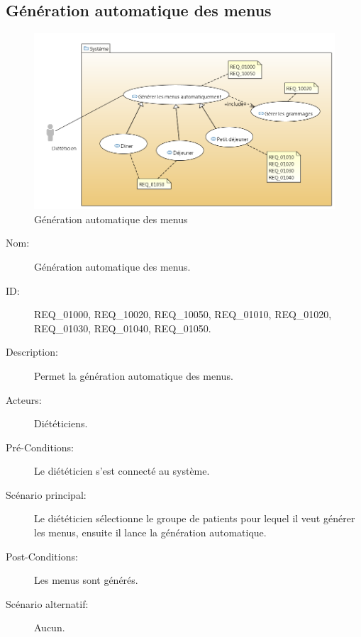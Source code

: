 \subsection{Génération automatique des menus}
\begin{figure}[H]
\label{MenuGen}
  \centering
      \includegraphics[width=1.00\textwidth]{../../CasDUtilisations/MenuGen/UseCase_Diagram} %
\caption{Génération automatique des menus}
\end{figure}

\begin{description}
\item[Nom:] Génération automatique des menus.
\item[ID:] REQ\_01000, REQ\_10020, REQ\_10050, REQ\_01010, REQ\_01020, REQ\_01030, REQ\_01040, REQ\_01050.
\item[Description:] Permet la génération automatique des menus.
\item[Acteurs:] Diététiciens.
\item[Pré-Conditions:] Le diététicien s'est connecté au système.
\item[Scénario principal:] Le diététicien sélectionne le groupe de patients pour lequel il veut générer les menus, ensuite il lance la génération automatique.
\item[Post-Conditions:] Les menus sont générés.
\item[Scénario alternatif:] Aucun.
\end{description}
